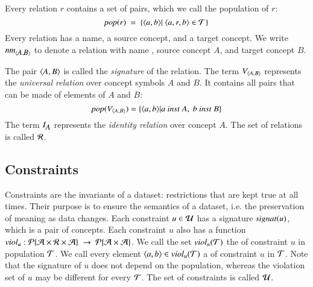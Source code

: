 \documentclass{elsarticle}
\begin{document}
	Every relation $r$ contains a set of pairs, which we call the population of $r$:
\begin{equation}
	\pop{r}\ =\ \{ \pair{a}{b}|\ \triple{a}{r}{b}\in\triples\}
\end{equation}
	Every relation has a name, a source concept, and a target concept.
	We write $\text{\it nm\/}_{\langle{\text{\it \small A\/}},{\text{\it \small B\/}}\rangle}$ to denote a relation with name , source concept $A$, and target concept $B$.

	The pair $\langle{A},{B}\rangle$ is called the \emph{signature} of the relation.
	The term $V_{\langle{A},{B}\rangle}$ represents the \emph{universal relation} over concept symbols $A$ and $B$.
	It contains all pairs that can be made of elements of $A$ and $B$:
\[\pop{\fullt{A}{B}} = \{ \pair{a}{b}| a\ \inst\ A,\ b\ \inst\ B \}\]
	The term $I_{\text{\it \small A\/}}$ represents the \emph{identity relation} over concept $A$.
	The set of relations is called $\mathcal{R}$.

	
\subsection{Constraints}
	Constraints are the invariants of a dataset: restrictions that are kept true at all times.
	Their purpose is to ensure the semantics of a dataset, i.e. the preservation of meaning as data changes.
	Each constraint $u\in\mathcal{U}$ has a signature $\text{\it signat\/}(u)$, which is a pair of concepts.
	Each constraint $u$ also has a function $\id{viol}_u:\powerset{\atoms\times\rels\times\atoms}\ \rightarrow\ \powerset{\atoms\times\atoms}$.
	We call the set $\text{\it viol\/}_{u}(\mathcal{T})$ the  of constraint $u$ in population $\mathcal{T}$.
	We call every element $\langle{a},{b}\rangle\in\text{\it viol\/}_{u}(\mathcal{T})$ a  of constraint $u$ in $\mathcal{T}$.
	Note that the signature of $u$ does not depend on the population, whereas the violation set of $u$ may be different for every $\mathcal{T}$.
	The set of constraints is called $\mathcal{U}$.
\end{document}
